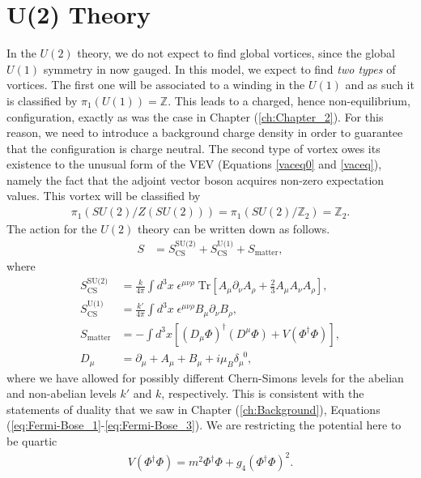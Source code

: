 \section{U(2) Theory}
In the $U(2)$ theory, we do not expect to find global vortices, since the global $U(1)$ symmetry in now gauged. In this model, we expect to find \textit{two types} of vortices. The first one will be associated to a winding in the $U(1)$ and as such it is classified by $\pi_1(U(1))= \mathbb{Z}$. This leads to a charged, hence non-equilibrium, configuration, exactly as was the case in Chapter (\ref{ch:Chapter_2}). For this reason, we need to introduce a background charge density in order to guarantee that the configuration is charge neutral. The second type of vortex owes its existence to the unusual form of the VEV (Equations \eqref{vaceq0} and \eqref{vaceq}), namely the fact that the adjoint vector boson acquires non-zero expectation values. This vortex will be classified by
\begin{align}
    \pi_1(SU(2)/Z(SU(2)))= \pi_1(SU(2)/\mathbb{Z}_2) = \mathbb{Z}_2. 
\end{align}
The action for the $U(2)$ theory can be written down as follows.    
\begin{align}
    S &= S^{\text{SU(2)}}_{\text{CS}} + S^{\text{U(1)}}_{\text{CS}} + S_{\text{matter}} \label{eq:Action_for_U2_non_abelian_vortices},
\end{align}
where
\begin{align}
    S^{\text{SU(2)}}_{\text{CS}} &= \frac{k}{4 \pi} \int d^3x \; \epsilon^{\mu \nu \rho} \; \mathrm{Tr} \left[A_{\mu} \partial_{\nu}A_{\rho}+ \frac{2}{3} A_{\mu} A_{\nu}A_{\rho} \right], \\
    S^{\text{U(1)}}_{\text{CS}} &= \frac{k'}{4 \pi} \int d^3x \; \epsilon^{\mu \nu \rho} B_{\mu} \partial_{\nu} B_{\rho},\\
    S_{\text{matter}}&= - \int d^3x \left[ \left(D_{\mu} \Phi \right)^{\dag} \left(D^{\mu} \Phi \right) + V\left(\Phi^{\dag}\Phi \right)\right], \\
    D_{\mu} &= \partial_{\mu} + A_{\mu}+B_{\mu} +i \mu_B \delta_{\mu}^{\;\; 0},
\end{align}
where we have allowed for possibly different Chern-Simons levels for the abelian and non-abelian levels $k'$ and $k$, respectively. This is consistent with the statements of duality that we saw in Chapter (\ref{ch:Background}), Equations (\ref{eq:Fermi-Bose_1}-\ref{eq:Fermi-Bose_3}). We are restricting the potential  here to be quartic 
\begin{align}
V\left(\Phi^{\dag} \Phi \right)= m^2 \Phi^{\dag} \Phi + g_4\left( \Phi^{\dag} \Phi\right)^2.
\end{align}
